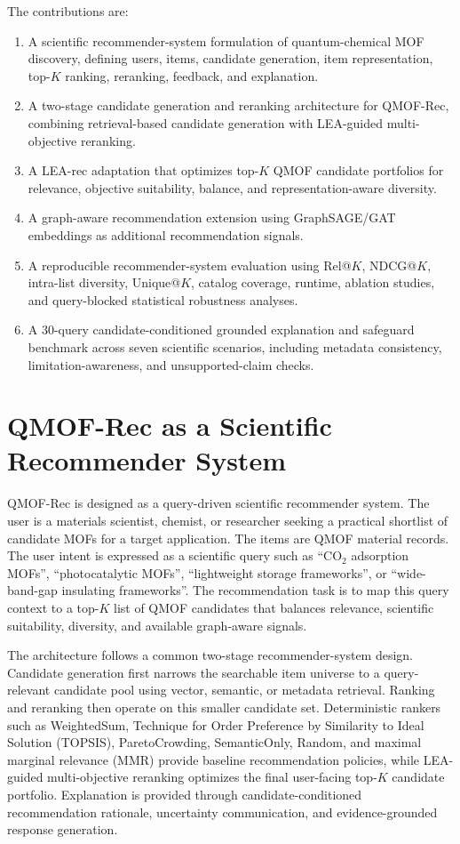 \documentclass[12pt,a4paper]{article}
\begin{document}
The contributions are:
\begin{enumerate}[leftmargin=*, label=\arabic*.]
  \item A scientific recommender-system formulation of quantum-chemical MOF discovery, defining users, items, candidate generation, item representation, top-$K$ ranking, reranking, feedback, and explanation.
  \item A two-stage candidate generation and reranking architecture for QMOF-Rec, combining retrieval-based candidate generation with LEA-guided multi-objective reranking.
  \item A LEA-rec adaptation that optimizes top-$K$ QMOF candidate portfolios for relevance, objective suitability, balance, and representation-aware diversity.
  \item A graph-aware recommendation extension using GraphSAGE/GAT embeddings as additional recommendation signals.
  \item A reproducible recommender-system evaluation using Rel@$K$, NDCG@$K$, intra-list diversity, Unique@$K$, catalog coverage, runtime, ablation studies, and query-blocked statistical robustness analyses.
  \item A 30-query candidate-conditioned grounded explanation and safeguard benchmark across seven scientific scenarios, including metadata consistency, limitation-awareness, and unsupported-claim checks.
\end{enumerate}

\section{QMOF-Rec as a Scientific Recommender System}
\label{sec:rec}

QMOF-Rec is designed as a query-driven scientific recommender system. The user is a materials scientist, chemist, or researcher seeking a practical shortlist of candidate MOFs for a target application. The items are QMOF material records. The user intent is expressed as a scientific query such as ``CO$_2$ adsorption MOFs'', ``photocatalytic MOFs'', ``lightweight storage frameworks'', or ``wide-band-gap insulating frameworks''. The recommendation task is to map this query context to a top-$K$ list of QMOF candidates that balances relevance, scientific suitability, diversity, and available graph-aware signals.

The architecture follows a common two-stage recommender-system design. Candidate generation first narrows the searchable item universe to a query-relevant candidate pool using vector, semantic, or metadata retrieval. Ranking and reranking then operate on this smaller candidate set. Deterministic rankers such as WeightedSum, Technique for Order Preference by Similarity to Ideal Solution (TOPSIS), ParetoCrowding, SemanticOnly, Random, and maximal marginal relevance (MMR) provide baseline recommendation policies, while LEA-guided multi-objective reranking optimizes the final user-facing top-$K$ candidate portfolio. Explanation is provided through candidate-conditioned recommendation rationale, uncertainty communication, and evidence-grounded response generation.
\end{document}
